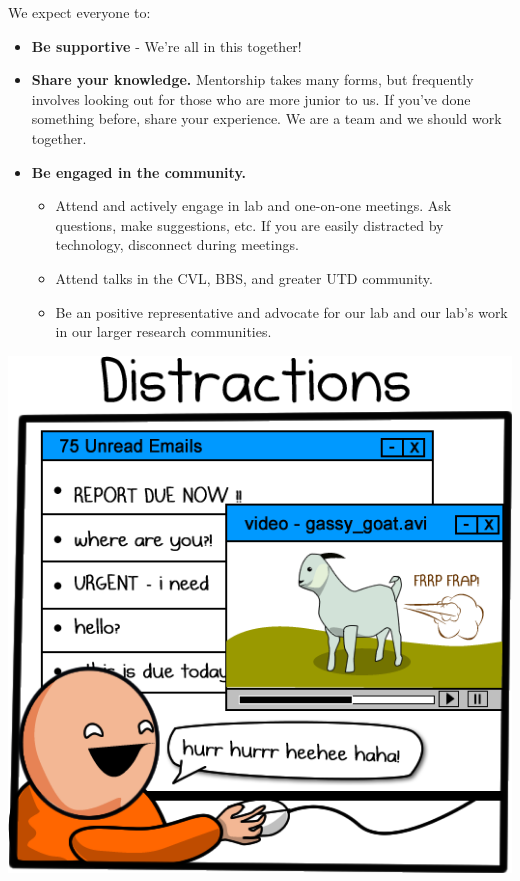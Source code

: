 \documentclass[]{book}
\providecommand{\tightlist}{%
  \setlength{\itemsep}{0pt}\setlength{\parskip}{0pt}}
\begin{document}
We expect everyone to:

\begin{itemize}
\tightlist
\item
  \textbf{Be supportive} - We're all in this together!\\
\item
  \textbf{Share your knowledge.} Mentorship takes many forms, but frequently involves looking out for those who are more junior to us. If you've done something before, share your experience. We are a team and we should work together.
\item
  \textbf{Be engaged in the community.}

  \begin{itemize}
  \tightlist
  \item
    Attend and actively engage in lab and one-on-one meetings. Ask questions, make suggestions, etc. If you are easily distracted by technology, disconnect during meetings.\\
  \item
    Attend talks in the CVL, BBS, and greater UTD community.\\
  \item
    Be an positive representative and advocate for our lab and our lab's work in our larger research communities.
  \end{itemize}
\end{itemize}

\includegraphics{images/distractions.png}
\end{document}
